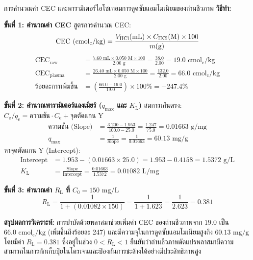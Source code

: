 \begin{examplebox}{การคำนวณค่า CEC และพารามิเตอร์ไอโซเทอมการดูดซับแอมโมเนียมของถ่านชีวภาพ}
\vspace{6pt}
\textbf{วิธีทำ:}

\textbf{ขั้นที่ 1: คำนวณค่า CEC}
สูตรการคำนวณ CEC:
\begin{equation*}
    \text{CEC } (\text{cmol}_{\text{c}}/\text{kg}) = \frac{V_{\ce{HCl}} (\text{mL}) \times C_{\ce{HCl}} (\text{M}) \times 100}{m (\text{g})}
\end{equation*}
\begin{align*}
    \text{CEC}_{\text{raw}} &= \frac{7.60 \text{ mL} \times 0.050 \text{ M} \times 100}{2.00 \text{ g}} = \frac{38.0}{2.00} = 19.0 \text{ cmol}_{\text{c}}/\text{kg} \\
    \text{CEC}_{\text{plasma}} &= \frac{26.40 \text{ mL} \times 0.050 \text{ M} \times 100}{2.00 \text{ g}} = \frac{132.0}{2.00} = 66.0 \text{ cmol}_{\text{c}}/\text{kg} \\
    \text{ร้อยละการเพิ่มขึ้น} &= \left( \frac{66.0 - 19.0}{19.0} \right) \times 100\% = +247.4\%
\end{align*}

\textbf{ขั้นที่ 2: คำนวณพารามิเตอร์แลงเมียร์ ($q_{\text{max}}$ และ $K_{\text{L}}$)}
สมการเส้นตรง: $C_{\text{e}}/q_{\text{e}} = \text{ความชัน} \cdot C_{\text{e}} + \text{จุดตัดแกน Y}$
\begin{align*}
    \text{ความชัน (Slope)} &= \frac{3.200 - 1.953}{100.0 - 25.0} = \frac{1.247}{75.0} = 0.01663 \text{ g/mg} \\
    q_{\text{max}} &= \frac{1}{\text{Slope}} = \frac{1}{0.01663} = 60.13 \text{ mg/g}
\end{align*}
หาจุดตัดแกน Y (Intercept):
\begin{align*}
    \text{Intercept} &= 1.953 - (0.01663 \times 25.0) = 1.953 - 0.4158 = 1.5372 \text{ g/L} \\
    K_{\text{L}} &= \frac{\text{Slope}}{\text{Intercept}} = \frac{0.01663}{1.5372} = 0.01082 \text{ L/mg}
\end{align*}

\textbf{ขั้นที่ 3: คำนวณค่า $R_{\text{L}}$ ที่ $C_0 = 150 \text{ mg/L}$}
\begin{equation*}
    R_{\text{L}} = \frac{1}{1 + (0.01082 \times 150)} = \frac{1}{1 + 1.623} = \frac{1}{2.623} = 0.381
\end{equation*}

\textbf{สรุปผลการวิเคราะห์:} การบำบัดด้วยพลาสมาช่วยเพิ่มค่า CEC ของถ่านชีวภาพจาก $19.0$ เป็น $66.0 \text{ cmol}_{\text{c}}/\text{kg}$ (เพิ่มขึ้นถึงร้อยละ 247) และมีความจุในการดูดซับแอมโมเนียมสูงถึง $60.13 \text{ mg/g}$ โดยมีค่า $R_{\text{L}} = 0.381$ ซึ่งอยู่ในช่วง $0 < R_{\text{L}} < 1$ ยืนยันว่าถ่านชีวภาพดัดแปรพลาสมามีความสามารถในการกักเก็บปุ๋ยไนโตรเจนและป้องกันการชะล้างได้อย่างมีประสิทธิภาพสูง
\end{examplebox}

